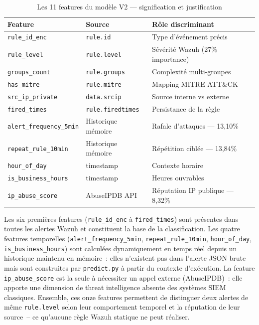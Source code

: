 \documentclass[12pt,a4paper]{report}
\begin{document}
\begin{table}[H]
\centering
\caption{Les 11 features du modèle V2 — signification et justification}
\label{tab:features}
\begin{tabular}{|l|p{2.8cm}|p{5.5cm}|}
\hline
\rowcolor{ColSection!15}
\textbf{Feature} & \textbf{Source} & \textbf{Rôle discriminant} \\
\hline
\texttt{rule\_id\_enc}         & \texttt{rule.id}         & Type d'événement précis \\
\texttt{rule\_level}           & \texttt{rule.level}      & Sévérité Wazuh (27\% importance) \\
\texttt{groups\_count}         & \texttt{rule.groups}     & Complexité multi-groupes \\
\texttt{has\_mitre}            & \texttt{rule.mitre}      & Mapping MITRE ATT\&CK \\
\texttt{src\_ip\_private}      & \texttt{data.srcip}      & Source interne vs externe \\
\texttt{fired\_times}          & \texttt{rule.firedtimes} & Persistance de la règle \\
\texttt{alert\_frequency\_5min}& Historique mémoire       & Rafale d'attaques — 13,10\% \\
\texttt{repeat\_rule\_10min}   & Historique mémoire       & Répétition ciblée — 13,84\% \\
\texttt{hour\_of\_day}         & timestamp                & Contexte horaire \\
\texttt{is\_business\_hours}   & timestamp                & Heures ouvrables \\
\texttt{ip\_abuse\_score}      & AbuseIPDB API            & Réputation IP publique — 8,32\% \\
\hline
\end{tabular}
\end{table}

Les six premières features (\texttt{rule\_id\_enc} à \texttt{fired\_times}) sont présentes dans toutes les alertes Wazuh et constituent la base de la classification. Les quatre features temporelles (\texttt{alert\_frequency\_5min}, \texttt{repeat\_rule\_10min}, \texttt{hour\_of\_day}, \texttt{is\_business\_hours}) sont calculées dynamiquement en temps réel depuis un historique maintenu en mémoire~: elles n'existent pas dans l'alerte JSON brute mais sont construites par \texttt{predict.py} à partir du contexte d'exécution. La feature \texttt{ip\_abuse\_score} est la seule à nécessiter un appel externe (AbuseIPDB)~: elle apporte une dimension de threat intelligence absente des systèmes SIEM classiques. Ensemble, ces onze features permettent de distinguer deux alertes de même \texttt{rule.level} selon leur comportement temporel et la réputation de leur source~-- ce qu'aucune règle Wazuh statique ne peut réaliser.
\end{document}
